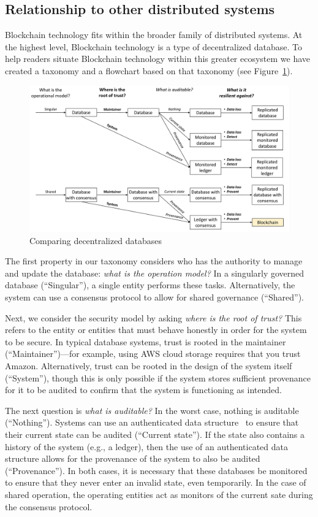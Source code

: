 \appendix

\subsection{Relationship to other distributed systems}
\label{sec:distributed-comparison}
Blockchain technology fits within the broader family of distributed systems.
At the highest level, Blockchain technology is a type of decentralized database.
To help readers situate Blockchain technology within this greater ecosystem we have created a taxonomy and a flowchart based on that taxonomy (see Figure~\ref{fig:blockchainFlowchart}).

\begin{figure}
	\centering
	\includegraphics[width=.75\textwidth]{figures/BlockchainFlowchart}
	\caption{Comparing decentralized databases}
	\label{fig:blockchainFlowchart}
\end{figure}

The first property in our taxonomy considers who has the authority to manage and update the database: \emph{what is the operation model?} In a singularly governed database (``Singular''), a single entity performs these tasks. Alternatively, the system can use a consensus protocol to allow for shared governance (``Shared'').

Next, we consider the security model by asking \emph{where is the root of trust?}
This refers to the entity or entities that must behave honestly in order for the system to be secure.
In typical database systems, trust is rooted in the maintainer (``Maintainer'')---for example, using AWS cloud storage requires that you trust Amazon.
Alternatively, trust can be rooted in the design of the system itself (``System''), though this is only possible if the system stores sufficient provenance for it to be audited to confirm that the system is functioning as intended.

The next question is \emph{what is auditable?}
In the worst case, nothing is auditable (``Nothing'').
Systems can use an authenticated data structure~\cite{tamassia2003authenticated} to ensure that their current state can be audited (``Current state'').
If the state also contains a history of the system (e.g., a ledger), then the use of an authenticated data structure allows for the provenance of the system to also be audited (``Provenance'').
In both cases, it is necessary that these databases be monitored to ensure that they never enter an invalid state, even temporarily.
In the case of shared operation, the operating entities act as monitors of the current sate during the consensus protocol.

